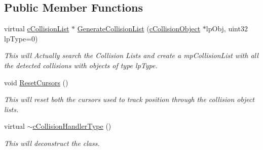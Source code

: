 \subsection*{Public Member Functions}
\begin{DoxyCompactItemize}
\item 
virtual \hyperlink{classc_collision_list}{cCollisionList} $\ast$ \hyperlink{classc_collision_handler_type_aaab07676063aa5b0773a1c908b202d53}{GenerateCollisionList} (\hyperlink{classc_collision_object}{cCollisionObject} $\ast$lpObj, uint32 lpType=0)
\begin{DoxyCompactList}\small\item\em This will Actually search the Collision Lists and create a mpCollisionList with all the detected collisions with objects of type lpType. \item\end{DoxyCompactList}\item 
void \hyperlink{classc_collision_handler_type_a3d3300c41d38fa8a14c08dd0b94b6c41}{ResetCursors} ()
\begin{DoxyCompactList}\small\item\em This will reset both the cursors used to track position through the collision object lists. \item\end{DoxyCompactList}\item 
virtual \hyperlink{classc_collision_handler_type_a7da274bc57e20b2c93da79934072d26d}{$\sim$cCollisionHandlerType} ()
\begin{DoxyCompactList}\small\item\em This will deconstruct the class. \item\end{DoxyCompactList}\end{DoxyCompactItemize}
